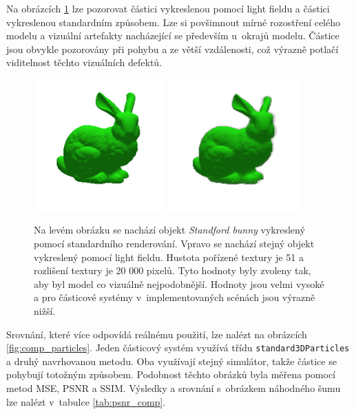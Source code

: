 Na obrázcích \ref{fig:comp_zoomed} lze pozorovat částici vykreslenou pomocí light fieldu a částici vykreslenou standardním způsobem. Lze si povšimnout mírné rozostření celého modelu a vizuální artefakty nacházející se především u~okrajů modelu. Částice jsou obvykle pozorovány při pohybu a ze větší vzdálenosti, což výrazně potlačí viditelnost těchto vizuálních defektů. 
\begin{figure}[H]
	\centering
	\includegraphics[width=0.45\textwidth]{obrazky-figures/bunny_nolightfield.png}
	\includegraphics[width=0.45\textwidth]{obrazky-figures/bunny_lightfield.png}
	\caption{Na levém obrázku se nachází objekt \emph{Standford bunny} vykreslený pomocí standardního renderování. Vpravo se nachází stejný objekt vykreslený pomocí light fieldu. Hustota pořízené textury je 51 a rozlišení textury je 20 000 pixelů. Tyto hodnoty byly zvoleny tak, aby byl model co vizuálně nejpodobnější. Hodnoty jsou velmi vysoké a pro částicové systémy v~implementovaných scénách jsou výrazně nižší.  }
	\label{fig:comp_zoomed}
\end{figure}
Srovnání, které více odpovídá reálnému použití, lze nalézt na obrázcích \ref{fig:comp_particles}. Jeden částicový systém využívá třídu \texttt{standard3DParticles} a druhý navrhovanou metodu. Oba využívají stejný simulátor, takže částice se pohybují totožným způsobem. Podobnost těchto obrázků byla měřena pomocí metod MSE, PSNR a SSIM. Výsledky a srovnání s~obrázkem náhodného šumu lze nalézt v~tabulce \ref{tab:psnr_comp}.


